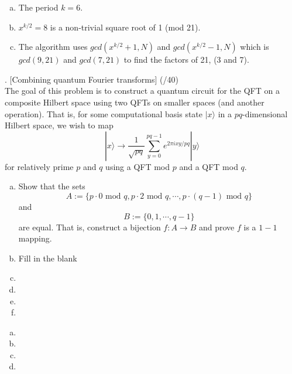 \documentclass[11pt]{article}
\newenvironment{solution}{\begin{mdframed}[skipabove=\baselineskip,innertopmargin=\baselineskip,innerbottommargin=\baselineskip]
  }{\end{mdframed}}
\begin{document}
\begin{solution}
\begin{enumerate}[(a)]
    \item The period $k=6$.
    \item $x^{k/2} = 8$ is a non-trivial square root of 1 (mod 21).
    \item The algorithm uses $gcd(x^{k/2}+1, N)$ and $gcd(x^{k/2}-1, N)$ which is $gcd(9, 21)$ and $gcd(7, 21)$ to find the factors of 21, (3 and 7).
\end{enumerate}
\end{solution}

\newpage

. [Combining quantum Fourier transforms] (/40)
\\
The goal of this problem is to construct a quantum circuit for the QFT on a composite Hilbert space using two QFTs on smaller spaces (and another operation). That is, for some computational basis state $|x\rangle$ in a $pq$-dimensional Hilbert space, we wish to map
$$|x\rangle\xrightarrow{}\frac{1}{\sqrt{pq}}\sum_{y=0}^{pq-1}e^{2\pi ixy/pq}|y\rangle$$
for relatively prime $p$ and $q$ using a QFT mod $p$ and a QFT mod $q$.

\begin{enumerate}[(a)] 
    \item Show that the sets
    $$A := \{p\cdot0 \text{ mod }q, p\cdot2 \text{ mod }q, \cdots , p\cdot(q-1) \text{ mod }q\}$$
    and
    $$B := \{0,1,\cdots,q-1\}$$
    are equal. That is, construct a bijection $f:A\xrightarrow{}B$ and prove $f$ is a $1-1$ mapping. %
    \item Fill in the blank
    \item 
    \item 
    \item 
    \item 
\end{enumerate}

\begin{solution}
\begin{enumerate}[(a)]
    \item
    \item
    \item 
    \item 
\end{enumerate}
\end{solution}
\end{document}
